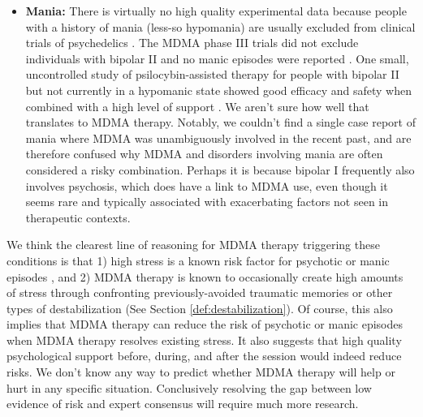 \documentclass[12pt,letterpaper]{book}
\begin{document}
\begin{itemize}
\begin{itemize}
            \item \textbf{Mania:} There is virtually no high quality experimental data because people with a history of mania (less-so hypomania) are usually excluded from clinical trials of psychedelics \cite{gardBipolar}. The MDMA phase III trials did not exclude individuals with bipolar II and no manic episodes were reported \cite{mitchellMDMAClinicalTrial2}. One small, uncontrolled study of psilocybin-assisted therapy for people with bipolar II but not currently in a hypomanic state showed good efficacy and safety when combined with a high level of support \cite{aaronsonBipolarII}. We aren't sure how well that translates to MDMA therapy. Notably, we couldn't find a single case report of mania where MDMA was unambiguously involved in the recent past, and are therefore confused why MDMA and disorders involving mania are often considered a risky combination. Perhaps it is because bipolar I frequently also involves psychosis, which does have a link to MDMA use, even though it seems rare and typically associated with exacerbating factors not seen in therapeutic contexts.
        \end{itemize}
     We think the clearest line of reasoning for MDMA therapy triggering these conditions is that 1) high stress is a known risk factor for psychotic or manic episodes \cite{winkelPsychosisStress,Umeoka2021stressmania}, and 2) MDMA therapy is known to occasionally create high amounts of stress through confronting previously-avoided traumatic memories or other types of destabilization (See Section \ref{def:destabilization}). Of course, this also implies that MDMA therapy can reduce the risk of psychotic or manic episodes when MDMA therapy resolves existing stress. It also suggests that high quality psychological support before, during, and after the session would indeed reduce risks. We don't know any way to predict whether MDMA therapy will help or hurt in any specific situation. Conclusively resolving the gap between low evidence of risk and expert consensus will require much more research.
\end{itemize}
\end{document}
